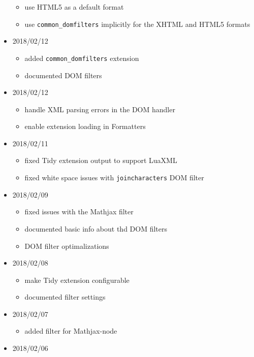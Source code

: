 \begin{itemize}
  \begin{itemize}
  \tightlist
  \item
    use HTML5 as a default format
  \item
    use \texttt{common\_domfilters} implicitly for the XHTML and HTML5
    formats
  \end{itemize}
\item
  2018/02/12

  \begin{itemize}
  \tightlist
  \item
    added \texttt{common\_domfilters} extension
  \item
    documented DOM filters
  \end{itemize}
\item
  2018/02/12

  \begin{itemize}
  \tightlist
  \item
    handle XML parsing errors in the DOM handler
  \item
    enable extension loading in Formatters
  \end{itemize}
\item
  2018/02/11

  \begin{itemize}
  \tightlist
  \item
    fixed Tidy extension output to support LuaXML
  \item
    fixed white space issues with \texttt{joincharacters} DOM filter
  \end{itemize}
\item
  2018/02/09

  \begin{itemize}
  \tightlist
  \item
    fixed issues with the Mathjax filter
  \item
    documented basic info about thd DOM filters
  \item
    DOM filter optimalizations
  \end{itemize}
\item
  2018/02/08

  \begin{itemize}
  \tightlist
  \item
    make Tidy extension configurable
  \item
    documented filter settings
  \end{itemize}
\item
  2018/02/07

  \begin{itemize}
  \tightlist
  \item
    added filter for Mathjax-node
  \end{itemize}
\item
  2018/02/06


\end{itemize}
